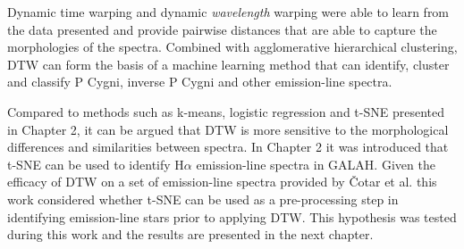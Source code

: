 Dynamic time warping and dynamic \emph{wavelength} warping were able to learn from the data presented and provide pairwise distances that are able to capture the morphologies of the spectra. Combined with agglomerative hierarchical clustering, DTW can form the basis of a machine learning method that can identify, cluster and classify P Cygni, inverse P Cygni and other emission-line spectra.

Compared to methods such as k-means, logistic regression and t-SNE presented in Chapter 2, it can be argued that DTW is more sensitive to the morphological differences and similarities between spectra. In Chapter 2 it was introduced that t-SNE can be used to identify H$\alpha$ emission-line spectra in GALAH. Given the efficacy of DTW on a set of emission-line spectra provided by Čotar et al. this work considered whether t-SNE can be used as a pre-processing step in identifying emission-line stars prior to applying DTW. This hypothesis was tested during this work and the results are presented in the next chapter. 








